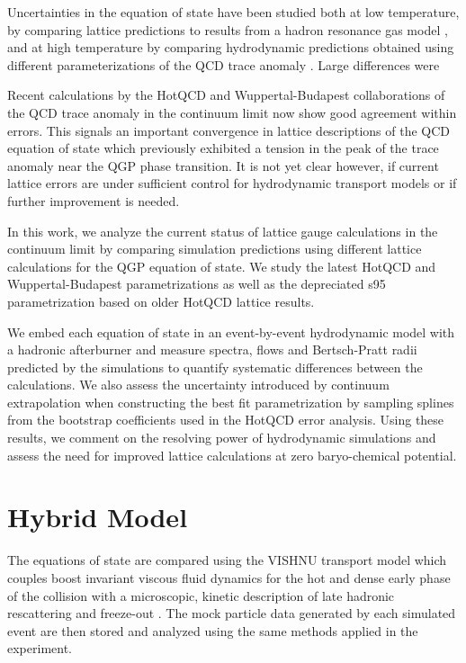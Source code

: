 \documentclass[aps,prc,reprint,amsmath,nofootinbib,superscriptaddress]{revtex4-1}
\begin{document}
Uncertainties in the equation of state have been studied both at low temperature, by comparing lattice predictions to results from a hadron 
resonance gas model \cite{Huovinen:2009yb}, and at high temperature by comparing hydrodynamic predictions obtained using different 
parameterizations of the QCD trace anomaly \cite{Huovinen:2005gy, Huovinen:2009yb}. Large differences were 

Recent calculations by the HotQCD and Wuppertal-Budapest collaborations of the QCD trace anomaly in the continuum limit now show good agreement 
within errors. This signals an important convergence in lattice descriptions of the QCD equation of state which previously exhibited a tension 
in the peak of the trace anomaly near the QGP phase transition. It is not yet clear however, if current lattice errors are under sufficient 
control for hydrodynamic transport models or if further improvement is needed.  

In this work, we analyze the current status of lattice gauge calculations in the continuum limit by comparing simulation predictions using 
different lattice calculations for the QGP equation of state. We study the latest HotQCD and Wuppertal-Budapest parametrizations as well as 
the depreciated s95 parametrization based on older HotQCD lattice results. 

We embed each equation of state in an event-by-event hydrodynamic model with a hadronic afterburner and measure spectra, flows and Bertsch-Pratt 
radii predicted by the simulations to quantify systematic differences between the calculations. We also assess the uncertainty introduced by 
continuum extrapolation when constructing the best fit parametrization by sampling splines from the bootstrap coefficients used in the HotQCD 
error analysis. Using these results, we comment on the resolving power of hydrodynamic simulations and assess the need for improved lattice 
calculations at zero baryo-chemical potential.

\section{Hybrid Model}

The equations of state are compared using the VISHNU transport model which couples boost invariant viscous fluid dynamics \cite{?} for the hot 
and dense early phase of the collision with a microscopic, kinetic description of late hadronic rescattering and freeze-out \cite{?}. The mock 
particle data generated by each simulated event are then stored and analyzed using the same methods applied in the experiment.
\end{document}
